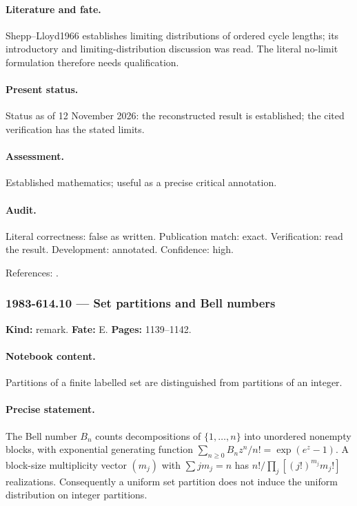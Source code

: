 \paragraph{Literature and fate.} Shepp--Lloyd1966 establishes limiting distributions of ordered cycle lengths; its introductory and limiting-distribution discussion was read. The literal no-limit formulation therefore needs qualification.

\paragraph{Present status.} Status as of 12 November 2026: the reconstructed result is established; the cited verification has the stated limits.

\paragraph{Assessment.} Established mathematics; useful as a precise critical annotation.

\paragraph{Audit.} Literal correctness: false as written. Publication match: exact. Verification: read the result. Development: annotated. Confidence: high.

\noindent References: \citep{shepplloyd1966cycles}.\par

\subsubsection{1983-614.10 --- Set partitions and Bell numbers}

\label{item:1983-614.10}

\noindent\textbf{Kind:} remark. \textbf{Fate:} E. \textbf{Pages:} 1139--1142.\par

\paragraph{Notebook content.} Partitions of a finite labelled set are distinguished from partitions of an integer.

\paragraph{Precise statement.} The Bell number $B_n$ counts decompositions of $\{1,\ldots,n\}$ into unordered nonempty blocks, with exponential generating function $\sum_{n\ge0}B_nz^n/n!=\exp(e^z-1)$. A block-size multiplicity vector $(m_j)$ with $\sum j m_j=n$ has $n!/\prod_j[(j!)^{m_j}m_j!]$ realizations. Consequently a uniform set partition does not induce the uniform distribution on integer partitions.

